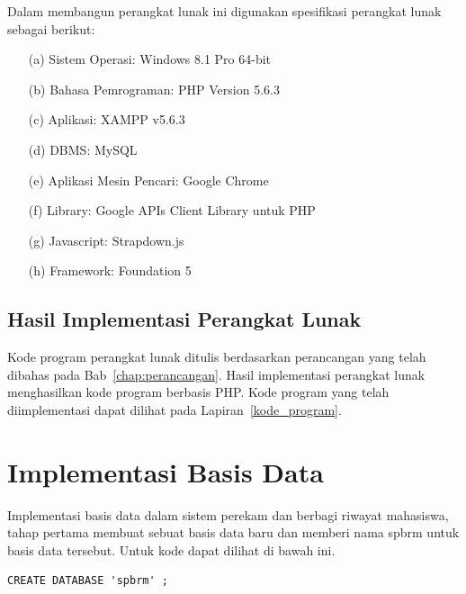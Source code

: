 Dalam membangun perangkat lunak ini digunakan spesifikasi perangkat lunak sebagai berikut:

\begin{enumerate}
\item[(a)] Sistem Operasi: Windows 8.1 Pro 64-bit
\item[(b)] Bahasa Pemrograman: PHP Version 5.6.3
\item[(c)] Aplikasi: XAMPP v5.6.3
\item[(d)] DBMS: MySQL
\item[(e)] Aplikasi Mesin Pencari: Google Chrome
\item[(f)] Library: Google APIs Client Library untuk PHP
\item[(g)] Javascript: Strapdown.js
\item[(h)] Framework: Foundation 5
\end{enumerate}

\subsection{Hasil Implementasi Perangkat Lunak}
\label{sec:hasilimplementasi}

Kode program perangkat lunak ditulis berdasarkan perancangan yang telah dibahas pada Bab~\ref{chap:perancangan}. Hasil implementasi perangkat lunak menghasilkan kode program berbasis PHP. Kode program yang telah diimplementasi dapat dilihat pada Lapiran~\ref{kode_program}.

\section{Implementasi Basis Data}
\label{sec:implementasibasisdata}

Implementasi basis data dalam sistem perekam dan berbagi riwayat mahasiswa, tahap pertama membuat sebuat basis data baru dan memberi nama spbrm untuk basis data tersebut. Untuk kode dapat dilihat di bawah ini.
\begin{lstlisting}[basicstyle=\footnotesize]
CREATE DATABASE 'spbrm' ;
\end{lstlisting}

